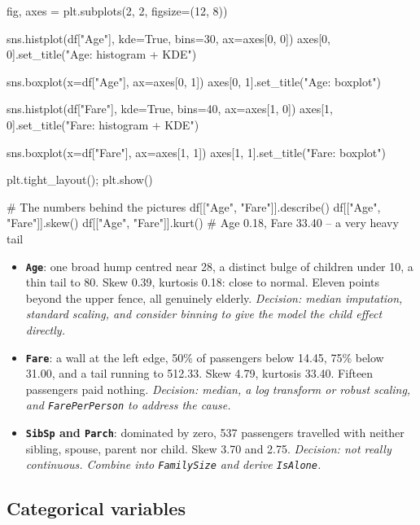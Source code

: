 \documentclass[11pt,a4paper]{article}
\begin{document}
\begin{py}
fig, axes = plt.subplots(2, 2, figsize=(12, 8))

sns.histplot(df["Age"],  kde=True, bins=30, ax=axes[0, 0])
axes[0, 0].set_title("Age: histogram + KDE")

sns.boxplot(x=df["Age"], ax=axes[0, 1])
axes[0, 1].set_title("Age: boxplot")

sns.histplot(df["Fare"], kde=True, bins=40, ax=axes[1, 0])
axes[1, 0].set_title("Fare: histogram + KDE")

sns.boxplot(x=df["Fare"], ax=axes[1, 1])
axes[1, 1].set_title("Fare: boxplot")

plt.tight_layout(); plt.show()

# The numbers behind the pictures
df[["Age", "Fare"]].describe()
df[["Age", "Fare"]].skew()
df[["Age", "Fare"]].kurt()      # Age 0.18, Fare 33.40 -- a very heavy tail
\end{py}


\begin{itemize}\itemsep3pt
  \item \textbf{\texttt{Age}}: one broad hump centred near 28, a distinct bulge of children
        under 10, a thin tail to 80. Skew 0.39, kurtosis 0.18: close to normal. Eleven
        points beyond the upper fence, all genuinely elderly. \emph{Decision: median
        imputation, standard scaling, and consider binning to give the model the child
        effect directly.}
  \item \textbf{\texttt{Fare}}: a wall at the left edge, 50\% of passengers below 14.45,
        75\% below 31.00, and a tail running to 512.33. Skew 4.79, kurtosis 33.40. Fifteen
        passengers paid nothing. \emph{Decision: median, a log transform or robust scaling,
        and \texttt{FarePerPerson} to address the cause.}
  \item \textbf{\texttt{SibSp} and \texttt{Parch}}: dominated by zero, 537 passengers
        travelled with neither sibling, spouse, parent nor child. Skew 3.70 and 2.75.
        \emph{Decision: not really continuous. Combine into \texttt{FamilySize} and derive
        \texttt{IsAlone}.}
\end{itemize}

\subsection{Categorical variables}
\end{document}
